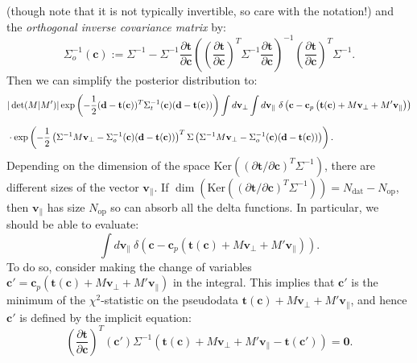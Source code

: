 \documentclass[withindex,glossary]{cam-thesis}
\renewcommand{\vec}[1]{\textbf{#1}} %
\begin{document}
(though note that it is not typically invertible, so care with the notation!) and the \textit{orthogonal inverse covariance matrix} by:
\begin{equation}
\Sigma^{-1}_o(\vec{c}) := \Sigma^{-1} - \Sigma^{-1} \frac{\partial \vec{t}}{\partial \vec{c}} \left( \left(\frac{\partial \vec{t}}{\partial \vec{c}} \right)^T \Sigma^{-1} \frac{\partial \vec{t}}{\partial \vec{c}} \right)^{-1} \left( \frac{\partial \vec{t}}{\partial \vec{c}} \right)^T \Sigma^{-1}.
\end{equation}
Then we can simplify the posterior distribution to:
\begin{align}
& |\det(M|M')|\exp\left( -\frac{1}{2}(\vec{d} - \vec{t}(\vec{c}))^T\Sigma_t^{-1}(\vec{c}) (\vec{d} - \vec{t}(\vec{c})) \right) \int d\vec{v}_{\perp} \int d\vec{v}_{\parallel}\ \delta\left(\vec{c} - \vec{c}_p\left(\vec{t}(\vec{c}) + M\vec{v}_{\perp} + M'\vec{v}_{\parallel}\right) \right)\notag\\[1.5ex]
& \cdot \exp\left( -\frac{1}{2} \left(\Sigma^{-1} M \vec{v}_{\perp} - \Sigma_o^{-1}(\vec{c}) (\vec{d} - \vec{t}(\vec{c}))\right)^T \Sigma \left(\Sigma^{-1} M \vec{v}_{\perp} - \Sigma_o^{-1}(\vec{c}) (\vec{d} - \vec{t}(\vec{c}))\right) \right).
\end{align}
Depending on the dimension of the space $\textrm{Ker}((\partial \vec{t} / \partial \vec{c})^T \Sigma^{-1})$, there are different sizes of the vector $\vec{v}_{\parallel}$. If $\dim(\textrm{Ker}((\partial \vec{t} / \partial \vec{c})^T \Sigma^{-1})) = N_{\text{dat}} - N_{\text{op}}$, then $\vec{v}_{\parallel}$ has size $N_{\text{op}}$ so can absorb all the delta functions. In particular, we should be able to evaluate:
\begin{equation}
\int d\vec{v}_{\parallel}\ \delta\left(\vec{c} - \vec{c}_p\left(\vec{t}(\vec{c}) + M\vec{v}_{\perp} + M'\vec{v}_{\parallel}\right) \right).
\end{equation}
To do so, consider making the change of variables $\vec{c}' = \vec{c}_p(\vec{t}(\vec{c}) + M\vec{v}_{\perp} + M'\vec{v}_{\parallel})$ in the integral. This implies that $\vec{c}'$ is the minimum of the $\chi^2$-statistic on the pseudodata $\vec{t}(\vec{c}) + M\vec{v}_{\perp} + M'\vec{v}_{\parallel}$, and hence $\vec{c}'$ is defined by the implicit equation:
\begin{equation}
\left( \frac{\partial \vec{t}}{\partial \vec{c}} \right)^T (\vec{c}') \Sigma^{-1} \left( \vec{t}(\vec{c}) + M\vec{v}_{\perp} + M'\vec{v}_{\parallel} - \vec{t}(\vec{c}') \right) = \vec{0}.
\end{equation}
\end{document}
